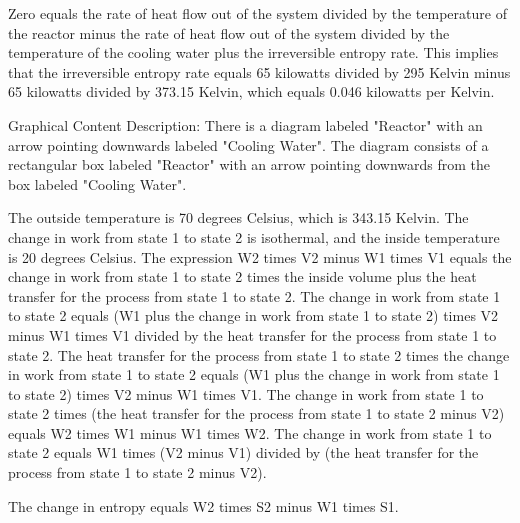 Zero equals the rate of heat flow out of the system divided by the temperature of the reactor minus the rate of heat flow out of the system divided by the temperature of the cooling water plus the irreversible entropy rate. This implies that the irreversible entropy rate equals 65 kilowatts divided by 295 Kelvin minus 65 kilowatts divided by 373.15 Kelvin, which equals 0.046 kilowatts per Kelvin.

Graphical Content Description:
There is a diagram labeled "Reactor" with an arrow pointing downwards labeled "Cooling Water". The diagram consists of a rectangular box labeled "Reactor" with an arrow pointing downwards from the box labeled "Cooling Water".

The outside temperature is 70 degrees Celsius, which is 343.15 Kelvin. The change in work from state 1 to state 2 is isothermal, and the inside temperature is 20 degrees Celsius. The expression W2 times V2 minus W1 times V1 equals the change in work from state 1 to state 2 times the inside volume plus the heat transfer for the process from state 1 to state 2. The change in work from state 1 to state 2 equals (W1 plus the change in work from state 1 to state 2) times V2 minus W1 times V1 divided by the heat transfer for the process from state 1 to state 2. The heat transfer for the process from state 1 to state 2 times the change in work from state 1 to state 2 equals (W1 plus the change in work from state 1 to state 2) times V2 minus W1 times V1. The change in work from state 1 to state 2 times (the heat transfer for the process from state 1 to state 2 minus V2) equals W2 times W1 minus W1 times W2. The change in work from state 1 to state 2 equals W1 times (V2 minus V1) divided by (the heat transfer for the process from state 1 to state 2 minus V2).

The change in entropy equals W2 times S2 minus W1 times S1.